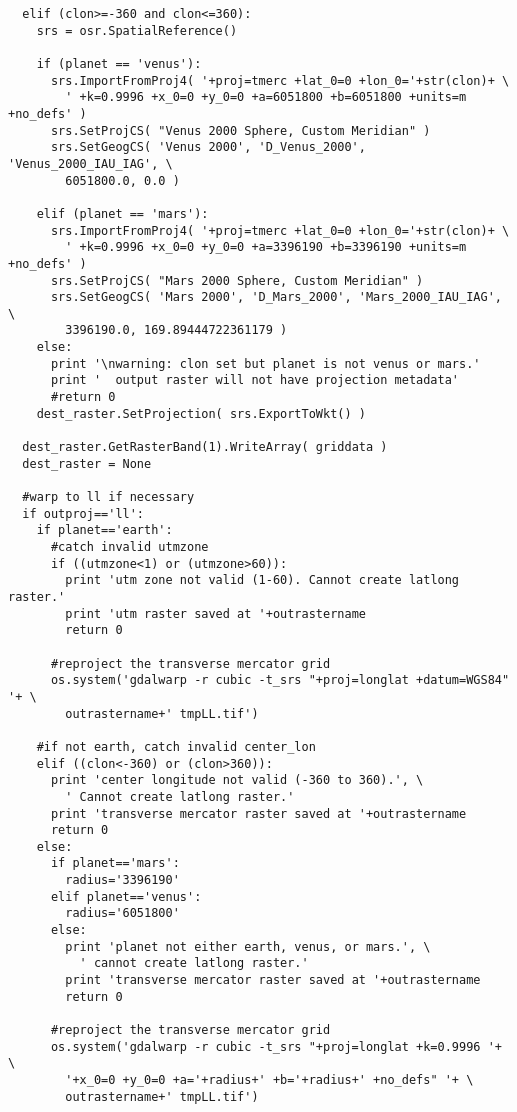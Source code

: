 \begin{verbatim}
  elif (clon>=-360 and clon<=360):
    srs = osr.SpatialReference()
    
    if (planet == 'venus'):
      srs.ImportFromProj4( '+proj=tmerc +lat_0=0 +lon_0='+str(clon)+ \
        ' +k=0.9996 +x_0=0 +y_0=0 +a=6051800 +b=6051800 +units=m +no_defs' )
      srs.SetProjCS( "Venus 2000 Sphere, Custom Meridian" )
      srs.SetGeogCS( 'Venus 2000', 'D_Venus_2000', 'Venus_2000_IAU_IAG', \
        6051800.0, 0.0 )
    
    elif (planet == 'mars'):
      srs.ImportFromProj4( '+proj=tmerc +lat_0=0 +lon_0='+str(clon)+ \
        ' +k=0.9996 +x_0=0 +y_0=0 +a=3396190 +b=3396190 +units=m +no_defs' )
      srs.SetProjCS( "Mars 2000 Sphere, Custom Meridian" )
      srs.SetGeogCS( 'Mars 2000', 'D_Mars_2000', 'Mars_2000_IAU_IAG', \
        3396190.0, 169.89444722361179 )
    else:
      print '\nwarning: clon set but planet is not venus or mars.'
      print '  output raster will not have projection metadata'
      #return 0
    dest_raster.SetProjection( srs.ExportToWkt() )
  
  dest_raster.GetRasterBand(1).WriteArray( griddata )
  dest_raster = None
  
  #warp to ll if necessary
  if outproj=='ll':
    if planet=='earth':
      #catch invalid utmzone
      if ((utmzone<1) or (utmzone>60)):
        print 'utm zone not valid (1-60). Cannot create latlong raster.'
        print 'utm raster saved at '+outrastername
        return 0
      
      #reproject the transverse mercator grid
      os.system('gdalwarp -r cubic -t_srs "+proj=longlat +datum=WGS84" '+ \
        outrastername+' tmpLL.tif')
      
    #if not earth, catch invalid center_lon
    elif ((clon<-360) or (clon>360)):
      print 'center longitude not valid (-360 to 360).', \
        ' Cannot create latlong raster.'
      print 'transverse mercator raster saved at '+outrastername
      return 0
    else:
      if planet=='mars':
        radius='3396190'
      elif planet=='venus':
        radius='6051800'
      else:
        print 'planet not either earth, venus, or mars.', \
          ' cannot create latlong raster.'
        print 'transverse mercator raster saved at '+outrastername
        return 0
      
      #reproject the transverse mercator grid
      os.system('gdalwarp -r cubic -t_srs "+proj=longlat +k=0.9996 '+ \
        '+x_0=0 +y_0=0 +a='+radius+' +b='+radius+' +no_defs" '+ \
        outrastername+' tmpLL.tif')
      

\end{verbatim}
